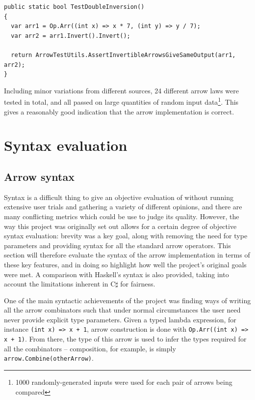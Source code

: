 \documentclass[12pt,twoside,notitlepage]{report}
\begin{document}
\begin{lstlisting}
public static bool TestDoubleInversion()
{
  var arr1 = Op.Arr((int x) => x * 7, (int y) => y / 7);
  var arr2 = arr1.Invert().Invert();

  return ArrowTestUtils.AssertInvertibleArrowsGiveSameOutput(arr1, arr2);
}
\end{lstlisting}

Including minor variations from different sources, 24 different arrow laws were tested in total, and all passed on large quantities of random input data\footnote{1000 randomly-generated inputs were used for each pair of arrows being compared}. This gives a reasonably good indication that the arrow implementation is correct.



\section{Syntax evaluation}

\subsection{Arrow syntax}

Syntax is a difficult thing to give an objective evaluation of without running extensive user trials and gathering a variety of different opinions, and there are many conflicting metrics which could be use to judge its quality. However, the way this project was originally set out allows for a certain degree of objective syntax evaluation: brevity was a key goal, along with removing the need for type parameters and providing syntax for all the standard arrow operators. This section will therefore evaluate the syntax of the arrow implementation in terms of these key features, and in doing so highlight how well the project's original goals were met. A comparison with Haskell's syntax is also provided, taking into account the limitations inherent in C$\sharp$ for fairness.

One of the main syntactic achievements of the project was finding ways of writing all the arrow combinators such that under normal circumstances the user need never provide explicit type parameters. Given a typed lambda expression, for instance \texttt{(int x) => x + 1}, arrow construction is done with \texttt{Op.Arr((int x) => x + 1)}. From there, the type of this arrow is used to infer the types required for all the combinators -- composition, for example, is simply \texttt{arrow.Combine(otherArrow)}.
\end{document}
